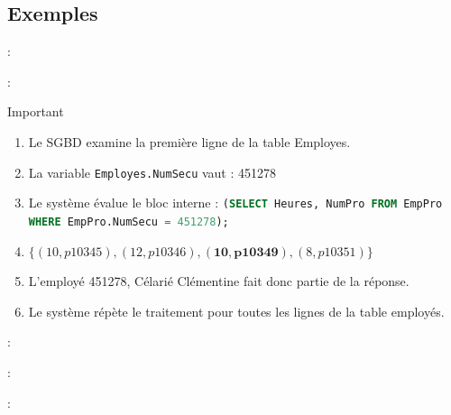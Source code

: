 \documentclass[10pt]{beamer}
\begin{document}
\subsection{Exemples}
\begin{frame}{\secname : \subsecname}
    
\end{frame}


\begin{frame}{\secname : \subsecname}
    \begin{alertblock}{Important}
        \begin{enumerate}
            \item Le SGBD examine la première ligne de la table Employes.
            \item La variable \lstinline[language=sql]!Employes.NumSecu! vaut : 451278
            \item Le système évalue le bloc interne : \lstinline[language=sql]!(SELECT Heures, NumPro FROM EmpPro WHERE EmpPro.NumSecu = 451278);!
            \item $\{(10, p10345), (12, p10346), \boldsymbol{(10, p10349)}, (8, p10351)\}$
            \item L'employé 451278, Célarié Clémentine fait donc partie de la réponse.
            \item Le système répète le traitement pour toutes les lignes de la table employés.
        \end{enumerate}
    \end{alertblock}
\end{frame}

\begin{frame}{\secname : \subsecname}
    
\end{frame}

\begin{frame}{\secname : \subsecname}
    
\end{frame}

\begin{frame}{\secname : \subsecname}
    
\end{frame}
\end{document}
